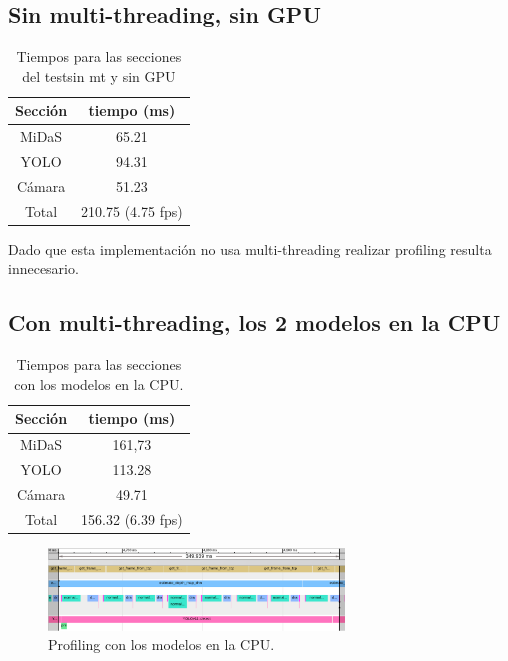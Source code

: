        \subsection{Sin multi-threading, sin GPU}

\begin{table}[H]    
    \centering
    \begin{tabular}{|c|c|}
        \hline
        \textbf{Sección} & \textbf{tiempo (ms)}  \\
        \hline
        MiDaS   & 65.21     \\
        YOLO    & 94.31     \\
        Cámara  & 51.23     \\
        Total   & 210.75 (4.75 fps)   \\
        \hline
    \end{tabular}
    \caption{Tiempos para las secciones del testsin mt y sin GPU}
    \label{tab:nomt_nogpu}
\end{table}

Dado que esta implementación no usa multi-threading realizar profiling resulta innecesario.

\newpage

        \subsection{Con multi-threading, los 2 modelos en la CPU}
\begin{table}[H]
    \centering
    \begin{tabular}{|c|c|}
        \hline
        \textbf{Sección} & \textbf{tiempo (ms)}  \\
        \hline
        MiDaS   & 161,73     \\
        YOLO    & 113.28    \\
        Cámara  & 49.71   \\
        Total   & 156.32 (6.39 fps)  \\

        \hline
    \end{tabular}
    \caption{Tiempos para las secciones con los modelos en la CPU.}
    \label{tab:cpu2}
\end{table}


\begin{figure}[H]
    \centering
    \includegraphics[width=0.7\textwidth]{images/2cpu_prof.png}
    \caption{Profiling con los modelos en la CPU.}
    \label{fig:cpu2_prof}
\end{figure}



